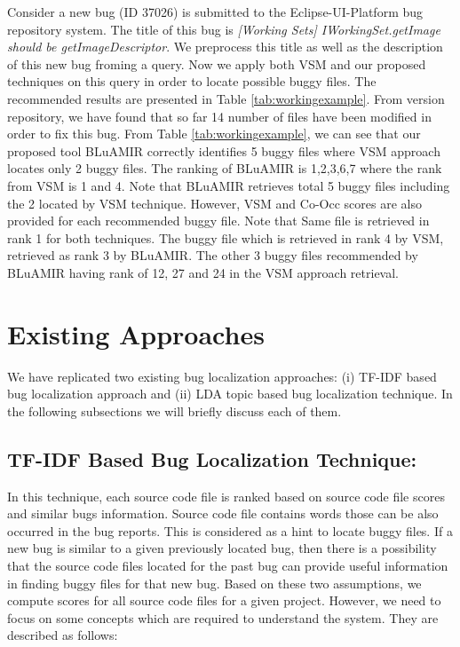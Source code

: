\documentclass[conference]{IEEEtran}
\begin{document}
Consider a new bug (ID 37026) is submitted to the Eclipse-UI-Platform bug repository system. The title of this bug is \textit{[Working Sets] IWorkingSet.getImage should be getImageDescriptor}. We preprocess this title as well as the description of this new bug froming a query. Now we apply both VSM and our proposed techniques on this query in order to locate possible buggy files. The recommended results are presented in Table \ref{tab:workingexample}. 
From version repository, we have found that so far 14 number of files have been modified in order to fix this bug. From Table \ref{tab:workingexample}, we can see that our proposed tool BLuAMIR correctly identifies 5 buggy files where VSM approach locates only 2 buggy files. The ranking of BLuAMIR is 1,2,3,6,7 where the rank from VSM is 1 and 4. Note that BLuAMIR retrieves total 5 buggy files including the 2 located by VSM technique. However, VSM and Co-Occ scores are also provided for each recommended buggy file. 
Note that Same file is retrieved in rank 1 for both techniques. The buggy file which is retrieved in rank 4 by VSM, retrieved as rank 3 by BLuAMIR. The other 3 buggy files recommended by BLuAMIR having rank of 12, 27 and 24  in the VSM approach retrieval.


\section{Existing Approaches}\label{sec:existing}
We have replicated two existing bug localization approaches: (i) TF-IDF based bug localization approach and (ii) LDA topic based bug localization technique. In the following subsections we will briefly discuss each of them.
\subsection{TF-IDF Based Bug Localization Technique:}
In this technique, each source code file is ranked based on source code file scores and similar bugs information. Source code file contains words those can be also occurred in the bug reports. This is considered as a hint to locate buggy files. If a new bug is similar to a given previously located bug, then there is a possibility that the source code files located for the past bug can provide useful information in finding buggy files for that new bug. Based on these two assumptions, we compute scores for all source code files for a given project. However, we need to focus on some concepts which are required to understand the  system. They are described as follows:
\end{document}
